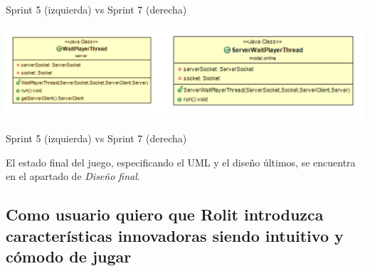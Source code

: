 \documentclass[../DocumentoOficial.tex]{subfiles}
\begin{document}
\begin{sprint}[7]
\begin{center}
Sprint 5 (izquierda) vs Sprint 7 (derecha)
\end{center}

\begin{center}
\includegraphics[scale=0.3]{WaitPlayerThread-evol.png} 

Sprint 5 (izquierda) vs Sprint 7 (derecha)
\end{center}

El estado final del juego, especificando el UML y el diseño últimos, se encuentra en el apartado de \textit{Diseño final}.

\end{sprint}

\newpage

\subsection{Como usuario quiero que Rolit introduzca características innovadoras siendo intuitivo y cómodo de jugar}
\end{document}
